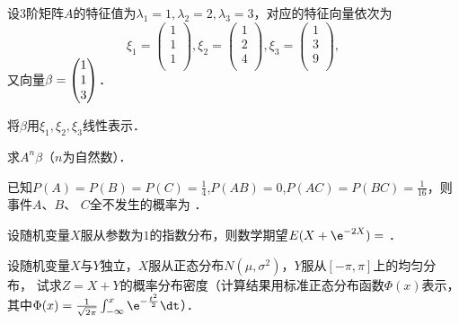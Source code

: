 \documentclass[plain,noanswer,medmath]{../../template/jnuexam}
\begin{document}

\begin{problem}
设$3$阶矩阵$A$的特征值为$\lambda_1 = 1,\lambda_2 = 2,\lambda_3 = 3$，对应的特征向量依次为
$$\xi_1 = \begin{pmatrix}
 1 \\
 1 \\
 1 \\
\end{pmatrix},\xi_2 = \begin{pmatrix}
 1 \\
 2 \\
 4 \\
\end{pmatrix},\xi_3 = \begin{pmatrix}
 1 \\
 3 \\
 9 \\
\end{pmatrix},$$
又向量$\beta = \smash[t]{\begin{pmatrix}
 1 \\
 1 \\
 3 \\
\end{pmatrix}}$．
\begin{enumerate*}
\item 将$\beta$用$\xi_1,\xi_2,\xi_3$线性表示．
\item 求$A^n\beta$（$n$为自然数）．
\end{enumerate*}
\end{problem}




\begin{problem}
已知$P(A) = P(B) = P(C) = \frac{1}{4}$,$P(AB) = 0$,$P(AC) = P(BC) = \frac{1}{16}$，则事件$A$、$B$、
$C$全不发生的概率为 \fillin{}．
\end{problem}


\begin{problem}
设随机变量$X$服从参数为$1$的指数分布，则数学期望$E(X + \e^{-2X}) =$ \fillin{}．
\end{problem}



\begin{problem}
设随机变量$X$与$Y$独立，$X$服从正态分布$N(\mu ,\sigma^2)$，$Y$服从$[- \pi ,\pi]$上的均匀分布，
试求$Z = X + Y$的概率分布密度（计算结果用标准正态分布函数$\Phi(x)$表示，
其中$\Phi(x) = \frac{1}{\sqrt{2\pi}}\int_{-\infty}^x \e^{- \frac{t^2}{2}} \dt$）．
\end{problem}
\end{document}

